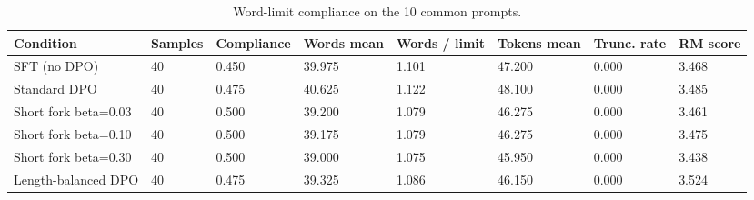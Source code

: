 \begin{table}[t]
\centering
\small
\caption{Word-limit compliance on the 10 common prompts.}
\begin{tabular}{llllllll}
\toprule
Condition & Samples & Compliance & Words mean & Words / limit & Tokens mean & Trunc. rate & RM score \\
\midrule
SFT (no DPO) & 40 & 0.450 & 39.975 & 1.101 & 47.200 & 0.000 & 3.468 \\
Standard DPO & 40 & 0.475 & 40.625 & 1.122 & 48.100 & 0.000 & 3.485 \\
Short fork beta=0.03 & 40 & 0.500 & 39.200 & 1.079 & 46.275 & 0.000 & 3.461 \\
Short fork beta=0.10 & 40 & 0.500 & 39.175 & 1.079 & 46.275 & 0.000 & 3.475 \\
Short fork beta=0.30 & 40 & 0.500 & 39.000 & 1.075 & 45.950 & 0.000 & 3.438 \\
Length-balanced DPO & 40 & 0.475 & 39.325 & 1.086 & 46.150 & 0.000 & 3.524 \\
\bottomrule
\end{tabular}
\end{table}

